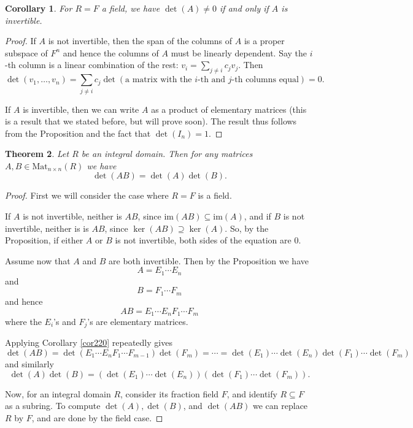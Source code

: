 \documentclass[12pt]{report}
\newtheorem{theorem}{Theorem}[chapter]
\newtheorem{corollary}[theorem]{Corollary}
\numberwithin{equation}{section}
\numberwithin{theorem}{chapter}
\theoremstyle{definition}
\newtheorem*{basic properties}{Basic Properties}
\newtheorem*{Important Remark}{Important Remark}
\renewcommand{\ker}{\operatorname{ker}}
\begin{document}
\begin{corollary}
  For $R = F$ a field, we have $\det(A) \ne 0$ if and only if $A$ is invertible.
\end{corollary}

\begin{proof}
If $A$ is not invertible, then the span of the columns of $A$ is a proper subspace of $F^n$ and hence
the columns of $A$ must be linearly dependent. Say the $i$-th column is a linear combination of the rest: $v_i = \sum_{j \ne i} c_j v_j$.
 Then 
$$
\det(v_1, \dots, v_n) = \sum_{j \ne i} c_j \det(\text{a matrix with the $i$-th and $j$-th columns equal}) = 0.
$$

If $A$ is invertible, then we can write $A$ as a product of elementary matrices (this is a result that we stated before, but will prove soon). The result thus follows from the Proposition and the fact that $\det(I_n) = 1$. 
\end{proof}





\begin{theorem} Let $R$ be an integral domain. Then for any matrices $A, B \in \mathrm{Mat}_{n \times n}(R)$ we have
$$
\det(AB) = \det(A) \det(B).
$$
\end{theorem}

  \begin{proof}
  First we will consider the case where $R=F$ is a field.
  
    If $A$ is not invertible, neither is $AB$, since $\mathrm{im}(AB) \subseteq \mathrm{im}(A)$, 
and if $B$ is not invertible, neither is is $AB$, since $\ker(AB) \supseteq \ker(A)$.  
So, by the Proposition, if either $A$ or $B$ is not invertible, both sides of the equation are $0$.

Assume now that $A$ and $B$ are both invertible.  Then by the Proposition we have
$$
A = E_1 \cdots E_n 
$$
and
$$
B = F_1 \cdots F_m
$$
and hence
$$
AB = E_1 \cdots E_n F_1 \cdots F_m
$$
where the $E_i$'s and $F_j$'s are elementary matrices.

Applying Corollary \ref{cor220} repeatedly gives
$$
\det(AB) = \det(E_1 \cdots E_n F_1 \cdots F_{m-1}) \det(F_m) = \cdots
= \det(E_1) \cdots \det(E_n) \det(F_1) \cdots \det(F_m)
$$
and similarly
$$
\det(A) \det(B) = \left(\det(E_1) \cdots \det(E_n)\right) \left( \det(F_1) \cdots \det(F_m)\right).
$$

Now, for an integral domain $R$, consider its fraction field $F$, and identify $R\subseteq F$ as a subring. To compute $\det(A), \det(B)$, and $\det(AB)$ we can replace $R$ by $F$, and are done by the field case.
\end{proof}
\end{document}
